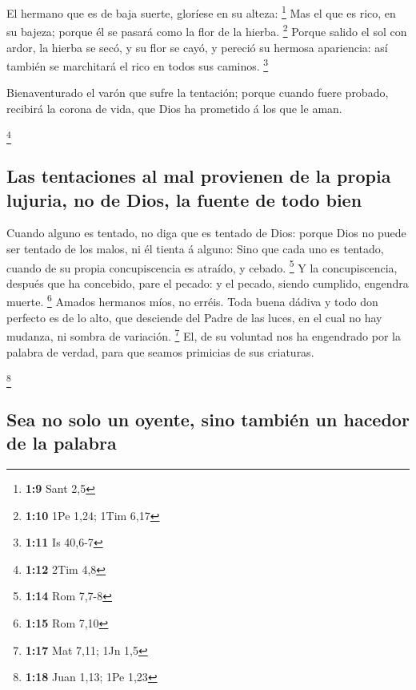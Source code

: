  El hermano que es de baja suerte, gloríese en su alteza:
\footnote{\textbf{1:9} Sant 2,5}  Mas el que es rico, en su
bajeza; porque él se pasará como la flor de la hierba. \footnote{\textbf{1:10}
  1Pe 1,24; 1Tim 6,17}  Porque salido el sol con ardor, la
hierba se secó, y su flor se cayó, y pereció su hermosa apariencia: así
también se marchitará el rico en todos sus caminos. \footnote{\textbf{1:11}
  Is 40,6-7}

 Bienaventurado el varón que sufre la tentación; porque
cuando fuere probado, recibirá la corona de vida, que Dios ha prometido
á los que le aman.

\footnote{\textbf{1:12} 2Tim 4,8}

\hypertarget{las-tentaciones-al-mal-provienen-de-la-propia-lujuria-no-de-dios-la-fuente-de-todo-bien}{%
\subsection{Las tentaciones al mal provienen de la propia lujuria, no de
Dios, la fuente de todo
bien}\label{las-tentaciones-al-mal-provienen-de-la-propia-lujuria-no-de-dios-la-fuente-de-todo-bien}}

 Cuando alguno es tentado, no diga que es tentado de Dios:
porque Dios no puede ser tentado de los malos, ni él tienta á alguno:
 Sino que cada uno es tentado, cuando de su propia
concupiscencia es atraído, y cebado. \footnote{\textbf{1:14} Rom 7,7-8}
 Y la concupiscencia, después que ha concebido, pare el
pecado: y el pecado, siendo cumplido, engendra muerte. \footnote{\textbf{1:15}
  Rom 7,10}  Amados hermanos míos, no erréis. 
Toda buena dádiva y todo don perfecto es de lo alto, que desciende del
Padre de las luces, en el cual no hay mudanza, ni sombra de variación.
\footnote{\textbf{1:17} Mat 7,11; 1Jn 1,5}  El, de su
voluntad nos ha engendrado por la palabra de verdad, para que seamos
primicias de sus criaturas.

\footnote{\textbf{1:18} Juan 1,13; 1Pe 1,23}

\hypertarget{sea-no-solo-un-oyente-sino-tambiuxe9n-un-hacedor-de-la-palabra}{%
\subsection{Sea no solo un oyente, sino también un hacedor de la
palabra}\label{sea-no-solo-un-oyente-sino-tambiuxe9n-un-hacedor-de-la-palabra}}

